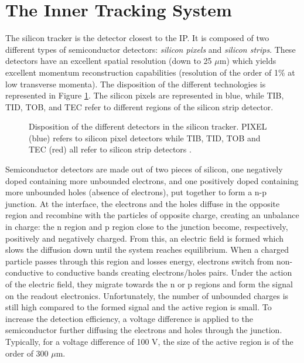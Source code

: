   \section{The Inner Tracking System}



  \newcommand{\GeVc}{GeV c$ ^{-1} $}
  \newcommand{\um}{$ \mu $m}
  \newcommand{\us}{$ \mu $s}
  \newcommand{\pT}{$ p_T $}
  \newcommand{\pZ}{$ p_Z $}
  \newcommand{\axis}[1]{#1}

  The silicon tracker is the detector closest to the IP. It is composed of two different types of semiconductor detectors: \emph{silicon pixels} and \emph{silicon strips}. These detectors have an excellent spatial resolution (down to 25 \um{}) which yields excellent momentum reconstruction capabilities (resolution of the order of 1\% at low transverse momenta). The disposition of the different technologies is represented in Figure \ref{fig:lhc_and_cms__cms_tracker}. The silicon pixels are represented in blue, while TIB, TID, TOB, and TEC refer to different regions of the silicon strip detector. \\

  \begin{figure}[h!]
    \centering
    \caption{Disposition of the different detectors in the silicon tracker. PIXEL (blue) refers to silicon pixel detectors while TIB, TID, TOB and TEC (red) all refer to silicon strip detectors \Cite{CMS_at_LHC}.}
    \label{fig:lhc_and_cms__cms_tracker}
  \end{figure}

  Semiconductor detectors are made out of two pieces of silicon, one negatively doped containing more unbounded electrons, and one positively doped containing more unbounded holes (absence of electrons), put together to form a n-p junction. At the interface, the electrons and the holes diffuse in the opposite region and recombine with the particles of opposite charge, creating an unbalance in charge: the n region and p region close to the junction become, respectively, positively and negatively charged. From this, an electric field is formed which slows the diffusion down until the system reaches equilibrium. When a charged particle passes through this region and losses energy, electrons switch from non-conductive to conductive bands creating electrons/holes pairs. Under the action of the electric field, they migrate towards the n or p regions and form the signal on the readout electronics. Unfortunately, the number of unbounded charges is still high compared to the formed signal and the active region is small. To increase the detection efficiency, a voltage difference is applied to the semiconductor further diffusing the electrons and holes through the junction. Typically, for a voltage difference of 100 V, the size of the active region is of the order of 300 \um{}.

